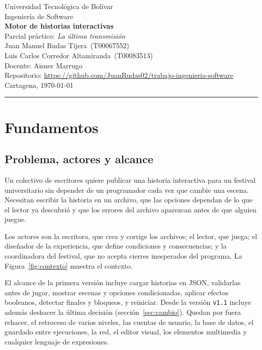 \documentclass[11pt,letterpaper]{article}
\newcommand{\cod}[1]{\texttt{#1}}
\newcommand{\integranteA}{Juan Manuel Rudas Tijera}
\newcommand{\codigo}{T00067552}
\newcommand{\integranteB}{Luis Carlos Corredor Altamiranda}
\newcommand{\codigoB}{T00083513}
\newcommand{\docente}{Aisner Marrugo}
\newcommand{\repo}{https://github.com/JuanRudas02/trabajo-ingenieria-software}
\begin{document}
\begin{center}
{\large Universidad Tecnológica de Bolívar}\\
Ingeniería de Software\\[10pt]
{\Large\bfseries Motor de historias interactivas}\\[2pt]
{\large Parcial práctico: \textit{La última transmisión}}\\[10pt]
\integranteA\ (\codigo)\\
\integranteB\ (\codigoB)\\[2pt]
Docente: \docente\\
Repositorio: \url{\repo}\\
Cartagena, \today
\end{center}
\vspace{2pt}
\noindent\rule{\linewidth}{0.4pt}

\section{Fundamentos}
\subsection{Problema, actores y alcance}
Un colectivo de escritores quiere publicar una historia interactiva para un festival universitario sin depender de un programador cada vez que cambie una escena. Necesitan escribir la historia en un archivo, que las opciones dependan de lo que el lector ya descubrió y que los errores del archivo aparezcan antes de que alguien juegue.

Los actores son la escritora, que crea y corrige los archivos; el lector, que juega; el diseñador de la experiencia, que define condiciones y consecuencias; y la coordinadora del festival, que no acepta cierres inesperados del programa. La Figura~\ref{fig:contexto} muestra el contexto.

El alcance de la primera versión incluye cargar historias en JSON, validarlas antes de jugar, mostrar escenas y opciones condicionadas, aplicar efectos booleanos, detectar finales y bloqueos, y reiniciar. Desde la versión \cod{v1.1} incluye además deshacer la última decisión (sección~\ref{sec:cambio}). Quedan por fuera rehacer, el retroceso de varios niveles, las cuentas de usuario, la base de datos, el guardado entre ejecuciones, la red, el editor visual, los elementos multimedia y cualquier lenguaje de expresiones.
\end{document}
